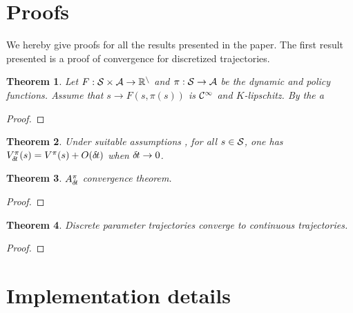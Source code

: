 \documentclass[11pt]{article}
\newtheorem{theorem}{Theorem}
\begin{document}
\section{Proofs}
We hereby give proofs for all the results presented in the paper.
The first result presented is a proof of convergence for discretized
trajectories.
\begin{theorem}
	Let $F: \cal{S} \times \cal{A} \rightarrow \mathbb{R}^n$ and
	$\pi: \cal{S} \rightarrow \cal{A}$ be the dynamic and policy
	functions. Assume that $s \rightarrow F(s, \pi(s))$ is 
	$\cal{C}^1$ and $K$-lipschitz. By the 
	a 

	\label{th:traj-conv}
\end{theorem}
\begin{proof}
	
\end{proof}
\begin{theorem}
	Under suitable assumptions , for all $s \in {\cal
	S}$, one has
	$V^\pi_{\delta\hspace{-.1em}t}(s) = V^\pi(s) + O({\delta\hspace{-.1em}t})$
	when ${\delta\hspace{-.1em}t}\to 0$.
	\label{th:conv-value}
\end{theorem}
% 	
\begin{theorem}
	$A^\pi_{\delta\hspace{-.1em}t}$ convergence theorem.
\end{theorem}
\begin{proof}
	
\end{proof}
\begin{theorem}
	Discrete parameter trajectories converge to continuous trajectories.
\end{theorem}
\begin{proof}
	
\end{proof}
\section{Implementation details}
\end{document}
